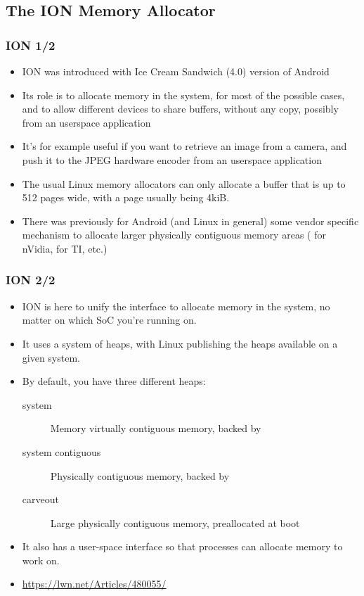 \subsection{The ION Memory Allocator}
\begin{frame}
  \frametitle{ION 1/2}
  \begin{itemize}
  \item ION was introduced with Ice Cream Sandwich (4.0) version of
    Android
  \item Its role is to allocate memory in the system, for most of the
    possible cases, and to allow different devices to share buffers,
    without any copy, possibly from an userspace application
  \item It's for example useful if you want to retrieve an image from
    a camera, and push it to the JPEG hardware encoder from an
    userspace application
  \item The usual Linux memory allocators can only allocate a buffer
    that is up to 512 pages wide, with a page usually being 4kiB.
  \item There was previously for Android (and Linux in general) some
    vendor specific mechanism to allocate larger physically contiguous
    memory areas ( for nVidia,  for TI, etc.)
  \end{itemize}
\end{frame}

\begin{frame}
  \frametitle{ION 2/2}
  \begin{itemize}
  \item ION is here to unify the interface to allocate memory in the
    system, no matter on which SoC you're running on.
  \item It uses a system of heaps, with Linux publishing the heaps
    available on a given system.
  \item By default, you have three different heaps:
    \begin{description}
    \item[system] Memory virtually contiguous memory, backed by
    \item[system contiguous] Physically contiguous memory, backed by
    \item[carveout] Large physically contiguous memory, preallocated
      at boot
    \end{description}
  \item It also has a user-space interface so that processes can
    allocate memory to work on.
  \item \url{https://lwn.net/Articles/480055/}
  \end{itemize}
\end{frame}

